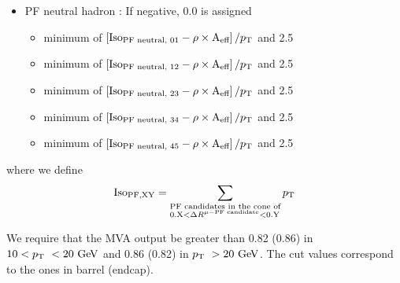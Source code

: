\begin{itemize}
\begin{itemize}
	\end{itemize}
\item PF neutral hadron : If negative, 0.0 is assigned
	\begin{itemize}
    \item minimum of $\left[\textrm{Iso}_\textrm{PF neutral, 01} - \rho \times \textrm{A}_{\textrm{eff}}\right]/p_\mathrm{T}$ and 2.5 
    \item minimum of $\left[\textrm{Iso}_\textrm{PF neutral, 12} - \rho \times \textrm{A}_{\textrm{eff}}\right]/p_\mathrm{T}$ and 2.5 
    \item minimum of $\left[\textrm{Iso}_\textrm{PF neutral, 23} - \rho \times \textrm{A}_{\textrm{eff}}\right]/p_\mathrm{T}$ and 2.5 
    \item minimum of $\left[\textrm{Iso}_\textrm{PF neutral, 34} - \rho \times \textrm{A}_{\textrm{eff}}\right]/p_\mathrm{T}$ and 2.5 
    \item minimum of $\left[\textrm{Iso}_\textrm{PF neutral, 45} - \rho \times \textrm{A}_{\textrm{eff}}\right]/p_\mathrm{T}$ and 2.5 
	\end{itemize}
\end{itemize}
where we define 
\begin{eqnarray} 
\textrm{Iso}_\textrm{PF,XY} 
= 
\sum_{
\begin{subarray}{l}
\textrm{PF candidates in the cone of} \\
\textrm{0.X}   < \Delta R^{\mu-\textrm{PF candidate}} < \textrm{0.Y} 
    \end{subarray} }
p_\mathrm{T}
\end{eqnarray} 

We require that the MVA output be greater than 0.82 (0.86) in $10<p_\mathrm{T}~<20~\mathrm{Ge\kern -0.1em V}$ 
and 0.86 (0.82) in $p_\mathrm{T}~>20~\mathrm{Ge\kern -0.1em V}$. The cut values correspond to the ones in barrel (endcap).


